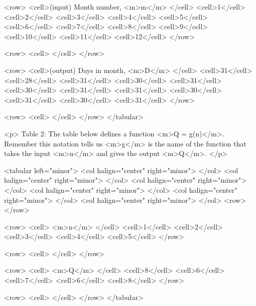             <row>
                <cell>(input) Month number, <m>m</m> </cell>
                <cell>1</cell>
                <cell>2</cell>
                <cell>3</cell>
                <cell>4</cell>
                <cell>5</cell>
                <cell>6</cell>
                <cell>7</cell>
                <cell>8</cell>
                <cell>9</cell>
                <cell>10</cell>
                <cell>11</cell>
                <cell>12</cell>
            </row>

            <row>
                <cell> </cell>
            </row>

            <row>
                <cell>(output) Days in month, <m>D</m> </cell>
                <cell>31</cell>
                <cell>28</cell>
                <cell>31</cell>
                <cell>30</cell>
                <cell>31</cell>
                <cell>30</cell>
                <cell>31</cell>
                <cell>31</cell>
                <cell>30</cell>
                <cell>31</cell>
                <cell>30</cell>
                <cell>31</cell>
            </row>

            <row>
                <cell> </cell>
            </row>
        </tabular>

        <p>
            Table 2: The table below defines a function <m>Q = g(n)</m>.
            Remember this notation tells us <m>g</m> is the name of the function that takes the input <m>n</m> and gives the output <m>Q</m>.
        </p>

        <tabular left="minor">
            <col halign="center" right="minor"> </col> <col halign="center" right="minor"> </col> <col halign="center" right="minor"> </col> <col halign="center" right="minor"> </col> <col halign="center" right="minor"> </col> <col halign="center" right="minor"> </col>
            <row>
            </row>

            <row>
                <cell> <m>n</m> </cell>
                <cell>1</cell>
                <cell>2</cell>
                <cell>3</cell>
                <cell>4</cell>
                <cell>5</cell>
            </row>

            <row>
                <cell> </cell>
            </row>

            <row>
                <cell> <m>Q</m> </cell>
                <cell>8</cell>
                <cell>6</cell>
                <cell>7</cell>
                <cell>6</cell>
                <cell>8</cell>
            </row>

            <row>
                <cell> </cell>
            </row>
        </tabular>


